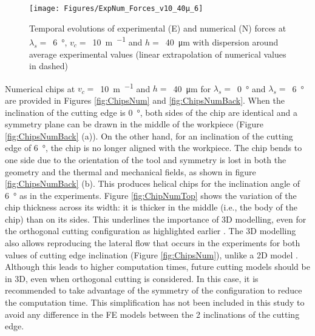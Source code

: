 \documentclass[preprint,12pt,times]{elsarticle}
\begin{document}
\begin{figure}[!h]
\centering
\texttt{[image: Figures/ExpNum\_Forces\_v10\_40µ\_6]}
\caption{Temporal evolutions of experimental (E) and numerical (N) forces at $\lambda_s =$~\qty{6}{\degree}, $v_c =$~\qty{10}{\m\per\min} and $h =$~\qty{40}{\um} with dispersion around average experimental values (linear extrapolation of numerical values in dashed)}
\label{fig:ExpNum_Forces_v10_40µ_6}
\end{figure}

Numerical chips at $v_c =$~\qty{10}{\m\per\min} and $h =$~\qty{40}{\um} for $\lambda_s =$~\qty{0}{\degree} and $\lambda_s =$~\qty{6}{\degree} are provided in Figures \ref{fig:ChipsNum} and \ref{fig:ChipsNumBack}. When the inclination of the cutting edge is \qty{0}{\degree}, both sides of the chip are identical and a symmetry plane can be drawn in the middle of the workpiece (Figure \ref{fig:ChipsNumBack} (a)). On the other hand, for an inclination of the cutting edge of \qty{6}{\degree}, the chip is no longer aligned with the workpiece. The chip bends to one side due to the orientation of the tool and symmetry is lost in both the geometry and the thermal and mechanical fields, as shown in figure \ref{fig:ChipsNumBack} (b). This produces helical chips for the inclination angle of \qty{6}{\degree} as in the experiments. Figure \ref{fig:ChipNumTop} shows the variation of the chip thickness across its width: it is thicker in the middle (i.e., the body of the chip) than on its sides. This underlines the importance of 3D modelling, even for the orthogonal cutting configuration as highlighted earlier \cite{ducobu_Finite_2017}. The 3D modelling also allows reproducing the lateral flow that occurs in the experiments for both values of cutting edge inclination (Figure \ref{fig:ChipsNum}), unlike a 2D model \cite{xu_Simulation_2021, ambrosio_New_2022, ducobu_Finite_2017}. Although this leads to higher computation times, future cutting models should be in 3D, even when orthogonal cutting is considered. In this case, it is recommended to take advantage of the symmetry of the configuration to reduce the computation time. This simplification has not been included in this study to avoid any difference in the FE models between the 2 inclinations of the cutting edge.
\end{document}
